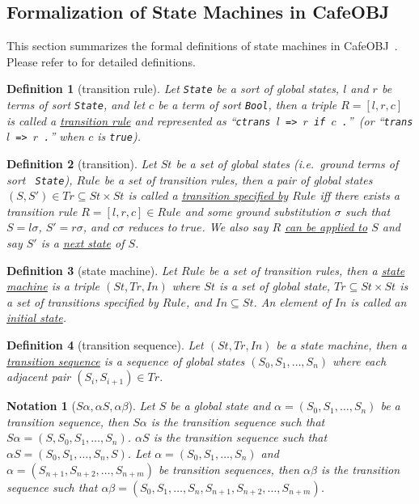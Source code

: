 \documentclass[12pt]{report}
\newtheorem{notation}{Notation}
\newtheorem{definition}{Definition}
\newcommand{\stt}[1]{{\small{\tt {#1}}}}
\newcommand{\ul}{\underline}
\newcommand{\cafeobj}{{\sf CafeOBJ}~}
\begin{document}
\subsection{Formalization of State Machines in \cafeobj}
\label{sec:statemachine}
This section summarizes the formal definitions of state machines in
\cafeobj. Please refer to \cite{Futatsugi15} for detailed
definitions.
\begin{definition}[transition rule]
  Let {\tt State} be a sort of global states, $l$ and $r$ be terms of
  sort {\tt State}, and let $c$ be a term of sort {\tt Bool}, then a
  triple $R = [l,r,c]$ is called a \ul{transition rule} and
  represented as ``\stt{ctrans $l$ => $r$ if $c$ .}''~(or ``\stt{trans
    $l$ => $r$ .}'' when $c$ is \stt{true}).
\end{definition}
\begin{definition}[transition]
  Let $S\!t$ be a set of global states (i.e.\ ground terms of sort {\tt
    State}), $Rule$ be a set of transition rules, then a pair of
  global states $(S,S')\in T\!r\subseteq S\!t\times S\!t$ is called a
  \ul{transition specified by} $Rule$ iff there exists a transition
  rule $R=[l,r,c]\in Rule$ and some ground substitution $\sigma$ such
  that $S=l\sigma$, $S'=r\sigma$, and $c\sigma$ reduces to $true$. We
  also say $R$ \ul{can be applied to} $S$ and say $S'$ is a \ul{next
    state} of $S$.
\end{definition}
\begin{definition}[state machine]
  Let $Rule$ be a set of transition rules, then a \ul{state machine}
  is a triple $(S\!t,T\!r,In)$ where $S\!t$ is a set of global state,
  $T\!r\subseteq S\!t\times S\!t$ is a set of transitions specified by
  $Rule$, and $In \subseteq S\!t$. An element of $In$ is called an
  \ul{initial state}.
\end{definition}
\begin{definition}[transition sequence]
  Let $(S\!t,T\!r,In)$ be a state machine, then a \ul{transition sequence} is a
  sequence of global states $(S\!_0,S\!_1,\dots,S\!_n)$ where each adjacent
  pair $(S\!_i,S\!_{i+1}) \in T\!r$. 
\end{definition}
\begin{notation}[$S\alpha,\alpha S,\alpha\beta$]
  Let $S$ be a global state and $\alpha=(S\!_0,S\!_1,\dots,S\!_n)$ be a
  transition sequence, then \ul{$S\alpha$} is the transition sequence
  such that $S\alpha=(S,S\!_0,S\!_1,\dots,S\!_n)$.  \ul{$\alpha S$} is the
  transition sequence such that $\alpha S=(S\!_0,S\!_1,\dots,S\!_n,S)$.  Let
  $\alpha=(S\!_0,S\!_1,\dots,S\!_n)$ and
  $\alpha=(S\!_{n+1},S\!_{n+2},\dots,S\!_{n+m})$ be transition sequences,
  then \ul{$\alpha\beta$} is the transition sequence such that
  $\alpha\beta=(S\!_0,S\!_1,\dots,S\!_n,S\!_{n+1},S\!_{n+2},\dots,S\!_{n+m})$.
\end{notation}
\end{document}

